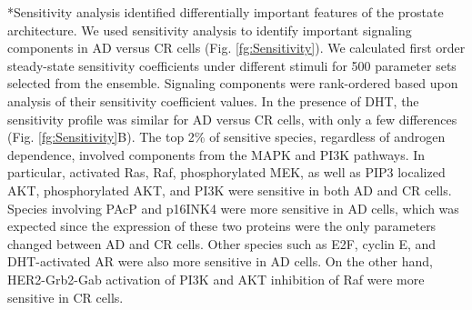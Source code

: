 \documentclass[12pt]{article}
\makeatletter
\renewcommand\subsection{\@startsection
	{subsection}{2}{0mm}
	{-0.05in}
	{-0.5\baselineskip}
	{\normalfont\normalsize\bfseries}}
\makeatother
\begin{document}
\subsection*{Sensitivity analysis identified differentially important features of the prostate architecture.} 
We used sensitivity analysis to identify important signaling components in AD versus CR cells (Fig. \ref{fg:Sensitivity}). 
We calculated first order steady-state sensitivity coefficients under different stimuli for 500 parameter sets selected from the ensemble. 
Signaling components were rank-ordered based upon analysis of their sensitivity coefficient values. 
In the presence of DHT, the sensitivity profile was similar for AD versus CR cells, with only a few differences (Fig. \ref{fg:Sensitivity}B). 
The top 2\% of sensitive species, regardless of androgen dependence, involved components from the MAPK and PI3K pathways. 
In particular, activated Ras, Raf, phosphorylated MEK, as well as PIP3 localized AKT, phosphorylated AKT, and PI3K were sensitive in both AD and CR cells. 
Species involving PAcP and p16INK4 were more sensitive in AD cells, which was expected since the expression of these two proteins were the only parameters changed between AD and CR cells. 
Other species such as E2F, cyclin E, and DHT-activated AR were also more sensitive in AD cells. 
On the other hand, HER2-Grb2-Gab activation of PI3K and AKT inhibition of Raf were more sensitive in CR cells.
\end{document}
